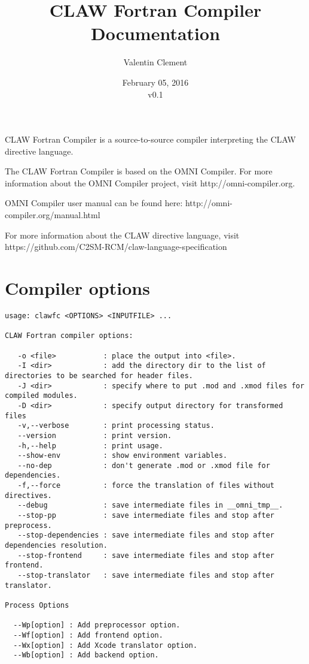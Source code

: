 \documentclass{article}
\title{CLAW Fortran Compiler Documentation}
\author{Valentin Clement}
\date{February 05, 2016\\\vspace{1em}v0.1}
\begin{document}
\maketitle

CLAW Fortran Compiler is a source-to-source compiler interpreting the CLAW
directive language.

The CLAW Fortran Compiler is based on the OMNI Compiler. For more information 
about the OMNI Compiler project, visit http://omni-compiler.org.
 
OMNI Compiler user manual can be found here: http://omni-compiler.org/manual.html

For more information about the CLAW directive language, visit
https://github.com/C2SM-RCM/claw-language-specification


\section{Compiler options}
\begin{lstlisting}
usage: clawfc <OPTIONS> <INPUTFILE> ...

CLAW Fortran compiler options:

   -o <file>           : place the output into <file>.
   -I <dir>            : add the directory dir to the list of directories to be searched for header files.
   -J <dir>            : specify where to put .mod and .xmod files for compiled modules.
   -D <dir>            : specify output directory for transformed files
   -v,--verbose        : print processing status.
   --version           : print version.
   -h,--help           : print usage.
   --show-env          : show environment variables.
   --no-dep            : don't generate .mod or .xmod file for dependencies.
   -f,--force          : force the translation of files without directives.
   --debug             : save intermediate files in __omni_tmp__.
   --stop-pp           : save intermediate files and stop after preprocess.
   --stop-dependencies : save intermediate files and stop after dependencies resolution.
   --stop-frontend     : save intermediate files and stop after frontend.
   --stop-translator   : save intermediate files and stop after translator.

Process Options

  --Wp[option] : Add preprocessor option.
  --Wf[option] : Add frontend option.
  --Wx[option] : Add Xcode translator option.
  --Wb[option] : Add backend option.
\end{lstlisting}
\end{document}
